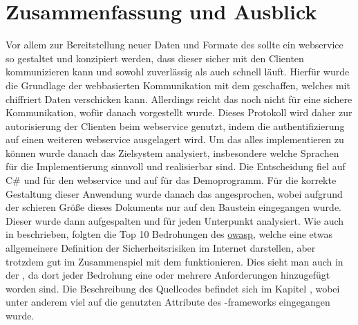 \chapter{Zusammenfassung und Ausblick}\label{ch:zusammenfassung-und-ausblick}

	Vor allem zur Bereitstellung neuer Daten und Formate des \lfidSystems{} sollte ein \gls{webservice} so gestaltet
	und konzipiert werden,
	dass dieser sicher mit den Clienten kommunizieren kann
	und sowohl zuverlässig als auch schnell läuft.
	Hierfür wurde die Grundlage der webbasierten Kommunikation mit dem  geschaffen,
	welches mit  chiffriert Daten verschicken kann.
	Allerdings reicht das noch nicht für eine sichere Kommunikation,
	wofür danach  vorgestellt wurde.
	Dieses Protokoll wird daher zur \gls{autorisierung} der Clienten beim \gls{webservice} genutzt,
	indem die \gls{authentifizierung} auf einen weiteren \gls{webservice} ausgelagert wird.
	Um das alles implementieren zu können wurde danach das Zielsystem analysiert,
	insbesondere welche Sprachen für die Implementierung sinnvoll und realisierbar sind.
	Die Entscheidung fiel auf C\# und  für den \gls{webservice}
	und auf  für das Demoprogramm.
	Für die korrekte Gestaltung dieser Anwendung wurde danach das  angesprochen,
	wobei aufgrund der schieren Größe dieses Dokuments
	nur auf den Baustein  eingegangen wurde.
	Dieser wurde dann aufgespalten und für jeden Unterpunkt analysiert.
	Wie auch in  beschrieben,
	folgten die Top 10 Bedrohungen des \hyperref[sec:owasp]{\gls{owasp}},
	welche eine etwas allgemeinere Definition der Sicherheitsrisiken im Internet darstellen,
	aber trotzdem gut im Zusammenspiel mit dem  funktionieren.
	Dies sieht man auch in der ,
	da dort jeder Bedrohung eine oder mehrere Anforderungen hinzugefügt worden sind.
	Die Beschreibung des Quellcodes befindet sich im Kapitel ,
	wobei unter anderem viel auf die genutzten Attribute des -\glspl{framework} eingegangen wurde.

